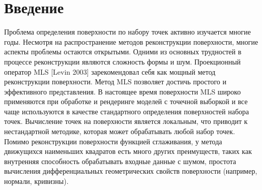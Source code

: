 \section*{Введение} 
Проблема определения поверхности по набору точек активно изучается многие годы. Несмотря на распространение методов реконструкции поверхности, многие аспекты проблемы остаются открытыми. Одними из основных трудностей в процессе реконструкции являются сложность формы и шум.  Проекционный оператор MLS [Levin 2003] зарекомендовал себя как мощный метод реконструкции поверхности. 
Метод MLS позволяет достичь простого и эффективного представления. В настоящее время поверхности MLS широко применяются при обработке и рендеринге моделей с точечной выборкой и все чаще используются в качестве стандартного определения поверхностей набора точек.  Вычисление точек на поверхности является локальным, что приводит к нестандартной методике, которая может обрабатывать любой набор точек. Помимо реконструкции поверхности функцией сглаживания, у метода движущихся наименьших квадратов есть много других преимуществ, таких как внутренняя способность обрабатывать входные данные с шумом, простота вычисления дифференциальных геометрических свойств поверхности (например, нормали, кривизны).




